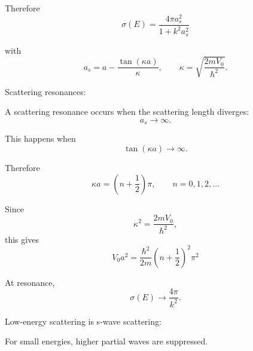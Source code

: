 \documentclass[11pt,a4paper]{scrartcl}
\begin{document}
\begin{enumerate}
\begin{enumerate}
\begin{calculationbox}
                        Therefore
                        \[
                        \boxed{
                        \sigma(E)
                        =
                        \frac{4\pi a_s^2}{1+k^2a_s^2}
                        }
                        \]

                        with
                        \[
                        a_s
                        =
                        a-\frac{\tan(\kappa a)}{\kappa},
                        \qquad
                        \kappa=\sqrt{\frac{2mV_0}{\hbar^2}}.
                        \]
                    \end{calculationbox}

                    Scattering resonances:
                    \begin{calculationbox}
                        A scattering resonance occurs when the scattering length diverges:
                        \[
                        a_s \to \infty.
                        \]

                        This happens when
                        \[
                        \tan(\kappa a) \to \infty.
                        \]

                        Therefore
                        \[
                        \kappa a
                        =
                        \left(n+\frac{1}{2}\right)\pi,
                        \qquad
                        n=0,1,2,\dots
                        \]

                        Since
                        \[
                        \kappa^2=\frac{2mV_0}{\hbar^2},
                        \]
                        this gives
                        \[
                        \boxed{
                        V_0a^2
                        =
                        \frac{\hbar^2}{2m}
                        \left(n+\frac{1}{2}\right)^2\pi^2
                        }
                        \]

                        At resonance,
                        \[
                        \sigma(E)
                        \to
                        \frac{4\pi}{k^2}.
                        \]
                    \end{calculationbox}

                    Low-energy scattering is s-wave scattering:
                    \begin{calculationbox}
                        For small energies, higher partial waves are suppressed.


\end{calculationbox}
\end{enumerate}
\end{enumerate}
\end{document}
